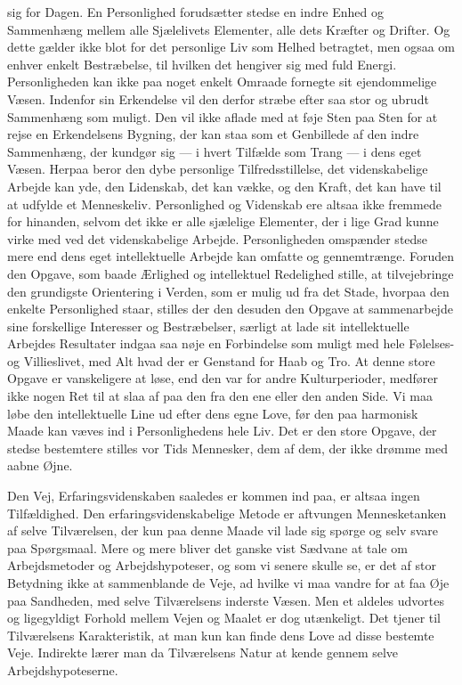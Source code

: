 \documentclass[12pt,a4paper]{article}
\newcommand{\opage}[1]{\marginnote{\footnotesize\textit{[#1]}}}
\begin{document}
sig for Dagen. En Personlighed forudsætter stedse en indre Enhed og
Sammenhæng mellem alle Sjælelivets Elementer, alle dets Kræfter og Drifter.
Og dette gælder ikke blot for det personlige Liv som Helhed betragtet, men
ogsaa om enhver enkelt Bestræbelse, til hvilken det hengiver sig med fuld
Energi. Personligheden kan ikke paa noget enkelt Omraade fornegte sit
ejendommelige Væsen. Indenfor sin Erkendelse vil den derfor stræbe efter saa
stor og ubrudt Sammenhæng som muligt. Den vil ikke aflade med at føje Sten
paa Sten for at rejse en Erkendelsens Bygning, der kan staa som et
Genbillede af den indre Sammenhæng, der kundgør sig --- i hvert Tilfælde som
Trang --- i dens eget Væsen. Herpaa beror den dybe personlige
Tilfredsstillelse, det videnskabelige Arbejde kan yde, den Lidenskab, det
kan vække, og den Kraft, det kan have til at udfylde et Menneskeliv.
Personlighed og Videnskab ere altsaa ikke fremmede for hinanden, selvom det
ikke er alle sjælelige Elementer, der i lige Grad kunne virke med ved det
videnskabelige Arbejde. Personligheden omspænder stedse mere end dens eget
intellektuelle Arbejde kan omfatte og gennemtrænge. Foruden den Opgave, som
baade Ærlighed og intellektuel Redelighed stille, at tilvejebringe den
grundigste Orientering i Verden, som er mulig ud fra det Stade, hvorpaa den
enkelte Personlighed staar, stilles der den desuden den \opage{24} Opgave at
sammenarbejde sine forskellige Interesser og Bestræbelser, særligt at lade
sit intellektuelle Arbejdes Resultater indgaa saa nøje en Forbindelse som
muligt med hele Følelses- og Villieslivet, med Alt hvad der er Genstand for
Haab og Tro. At denne store Opgave er vanskeligere at løse, end den var for
andre Kulturperioder, medfører ikke nogen Ret til at slaa af paa den fra den
ene eller den anden Side. Vi maa løbe den intellektuelle Line ud efter dens
egne Love, før den paa harmonisk Maade kan væves ind i Personlighedens hele
Liv. Det er den store Opgave, der stedse bestemtere stilles vor Tids
Mennesker, dem af dem, der ikke drømme med aabne Øjne.

Den Vej, Erfaringsvidenskaben saaledes er kommen ind paa, er altsaa ingen
Tilfældighed. Den erfaringsvidenskabelige Metode er aftvungen Mennesketanken
af selve Tilværelsen, der kun paa denne Maade vil lade sig spørge og selv
svare paa Spørgsmaal. Mere og mere bliver det ganske vist Sædvane at tale om
Arbejdsmetoder og Arbejdshypoteser, og som vi senere skulle se, er det af
stor Betydning ikke at sammenblande de Veje, ad hvilke vi maa vandre for at
faa Øje paa Sandheden, med selve Tilværelsens inderste Væsen. Men et
aldeles udvortes og ligegyldigt Forhold mellem Vejen og Maalet er dog
utænkeligt. Det tjener til Tilværelsens Karakteristik, at man kun kan finde
dens Love ad disse bestemte Veje. Indirekte lærer man da Tilværelsens Natur
at kende gennem selve Arbejdshypoteserne.
\end{document}
